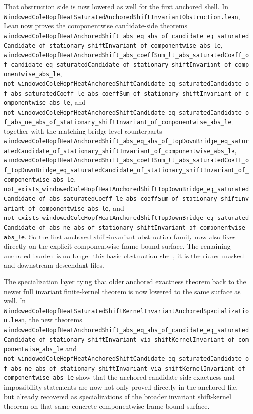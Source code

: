 \documentclass[11pt]{article}
\theoremstyle{remark}
\begin{document}
That obstruction side is now lowered as well for the first anchored shell.  In
\texttt{WindowedColeHopfHeatSaturatedAnchoredShiftInvariantObstruction.lean},
Lean now proves the componentwise candidate-side theorems
\texttt{windowedColeHopfHeatAnchoredShift\_abs\_eq\_abs\_of\_candidate\_eq\_saturatedCandidate\_of\_stationary\_shiftInvariant\_of\_componentwise\_abs\_le},
\texttt{windowedColeHopfHeatAnchoredShift\_abs\_coeffSum\_lt\_abs\_saturatedCoeff\_of\_candidate\_eq\_saturatedCandidate\_of\_stationary\_shiftInvariant\_of\_componentwise\_abs\_le},
\texttt{not\_windowedColeHopfHeatAnchoredShiftCandidate\_eq\_saturatedCandidate\_of\_abs\_saturatedCoeff\_le\_abs\_coeffSum\_of\_stationary\_shiftInvariant\_of\_componentwise\_abs\_le},
and
\texttt{not\_windowedColeHopfHeatAnchoredShiftCandidate\_eq\_saturatedCandidate\_of\_abs\_ne\_abs\_of\_stationary\_shiftInvariant\_of\_componentwise\_abs\_le},
together with the matching bridge-level counterparts
\texttt{windowedColeHopfHeatAnchoredShift\_abs\_eq\_abs\_of\_topDownBridge\_eq\_saturatedCandidate\_of\_stationary\_shiftInvariant\_of\_componentwise\_abs\_le},
\texttt{windowedColeHopfHeatAnchoredShift\_abs\_coeffSum\_lt\_abs\_saturatedCoeff\_of\_topDownBridge\_eq\_saturatedCandidate\_of\_stationary\_shiftInvariant\_of\_componentwise\_abs\_le},
\texttt{not\_exists\_windowedColeHopfHeatAnchoredShiftTopDownBridge\_eq\_saturatedCandidate\_of\_abs\_saturatedCoeff\_le\_abs\_coeffSum\_of\_stationary\_shiftInvariant\_of\_componentwise\_abs\_le},
and
\texttt{not\_exists\_windowedColeHopfHeatAnchoredShiftTopDownBridge\_eq\_saturatedCandidate\_of\_abs\_ne\_abs\_of\_stationary\_shiftInvariant\_of\_componentwise\_abs\_le}.
So the first anchored shift-invariant obstruction family now also lives
directly on the explicit componentwise frame-bound surface.  The remaining
anchored burden is no longer this basic obstruction shell; it is the richer
masked and downstream descendant files.

The specialization layer tying that older anchored exactness theorem back to
the newer full invariant finite-kernel theorem is now lowered to the same
surface as well.  In
\texttt{WindowedColeHopfHeatSaturatedShiftKernelInvariantAnchoredSpecialization.lean},
the new theorems
\texttt{windowedColeHopfHeatAnchoredShift\_abs\_eq\_abs\_of\_candidate\_eq\_saturatedCandidate\_of\_stationary\_shiftInvariant\_via\_shiftKernelInvariant\_of\_componentwise\_abs\_le}
and
\texttt{not\_windowedColeHopfHeatAnchoredShiftCandidate\_eq\_saturatedCandidate\_of\_abs\_ne\_abs\_of\_stationary\_shiftInvariant\_via\_shiftKernelInvariant\_of\_componentwise\_abs\_le}
show that the anchored candidate-side exactness and impossibility statements
are now not only proved directly in the anchored file, but already recovered as
specializations of the broader invariant shift-kernel theorem on that same
concrete componentwise frame-bound surface.
\end{document}
